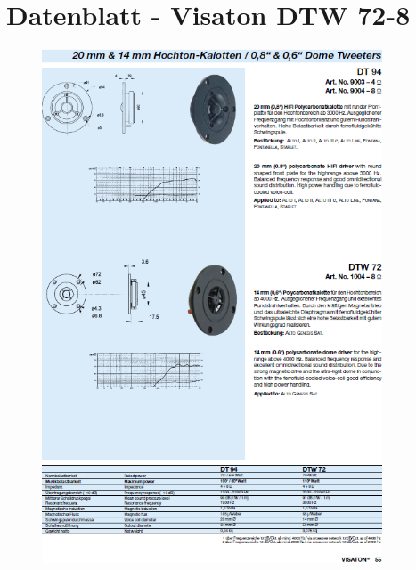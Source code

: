 \section{Datenblatt - Visaton DTW 72-8}\label{sec:8.8}
\begin{figure} [H]	
	\centering
	\includegraphics[width=0.9\textwidth]{form/VIS_DTW72.PNG}
\end{figure}



